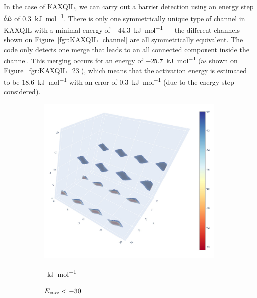 \documentclass[main]{subfiles}
\begin{document}
In the case of KAXQIL, we can carry out a barrier detection using an energy step $\delta E$ of \SI{0.3}{\kJ\per\mol}. There is only one symmetrically unique type of channel in KAXQIL with a minimal energy of $-44.3$~\si{\kJ\per\mole} --- the different channels shown on Figure~\ref{fgr:KAXQIL_channel} are all symmetrically equivalent. The code only detects one merge that leads to an all connected component inside the channel. This merging occurs for an energy of $-25.7$~\si{\kJ\per\mole} (as shown on Figure~\ref{fgr:KAXQIL_23}), which means that the activation energy is estimated to be $18.6$~\si{\kJ\per\mole} with an error of \SI{0.3}{\kJ\per\mole} (due to the energy step considered). 

\begin{figure}[ht]
  \centering
  \begin{subfigure}[b]{0.3\textwidth}
    \centering
    \includegraphics[width=\textwidth]{figures/5-diffusion/KAXQIL_30.jpg}
    \caption{$E_{\text{max}}<-30$}~\si{\kJ\per\mole}\label{fgr:KAXQIL_30}
  \end{subfigure}
  \hfill
  \begin{subfigure}[b]{0.3\textwidth}
    \centering

\end{subfigure}
\end{figure}
\end{document}
